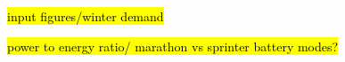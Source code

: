 \hl{input figures/winter demand}



\hl{power to energy ratio/ marathon vs sprinter battery modes?}


\begin{comment}
\textbf{Power-to-energy ratio (P/E ratio)}

``If the battery system will be used primarily to provide frequency regulation, the battery system needs to charge and discharge many times over short durations of time. A system used in this type of scenario will be designed with a higher power rating. If a battery system will be used primarily to provide peak-shifting or must provide backup power in case of a grid outage, the battery needs to be able to discharge over a longer period (e.g., 2 – 5 hours) and is designed with a higher energy rating."
\url{https://www.nrel.gov/state-local-tribal/blog/posts/batteries-101-series-how-to-talk-about-batteries-and-power-to-energy-ratios.html}

C.f. ``"Marathon" and "sprinter" metrics"
\url{https://www.greentechmedia.com/articles/read/comparing-energy-storage-its-not-that-simple#gs.3osuww}

``Concluding Thoughts
The optimum specifications for a PHS scheme in Scotland used to store surplus wind power for use during calm periods should have a power / stored energy ratio ~ 0.006. Given the storage size of Coire Glas = 30 GWh the power rating should ideally be ~ 180 MW and not the massive 1500 MW now proposed for the site. The 180 MW power rating would drain the reservoir in 7 days of continuous name plate capacity use. The facility would now be used for 7 out of 21 days (A+B+C), i.e. the equivalent of 1 day in 3 which is the closest we have got to every day, the norm for making PHS profitable. The catch now, however, is that the puny beast has now become totally limp with a power rating of only 180 MW – it can never ever make money."
\url{http://euanmearns.com/coire-glas-the-raging-best-of-pumped-hydro-storage/}
\end{comment}